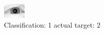 \begin{figure}[h!]
\begin{center}
\includegraphics[width=0.60\columnwidth]{figures/ID3082_class_1_target_2.png}
\end{center}
\caption{ Classification: 1 actual target: 2}
\label{fig:ID3082_class_1_target_2}
\end{figure}

